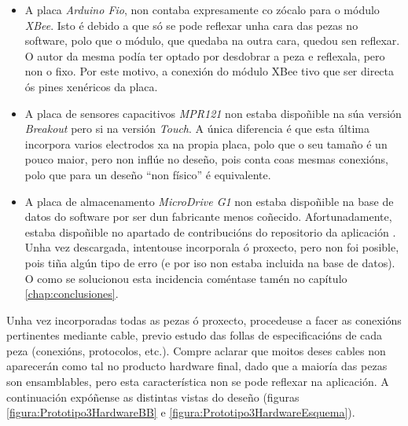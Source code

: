   \begin{itemize}
   \item A placa \textit{Arduino Fio}, non contaba expresamente co zócalo para
         o módulo \textit{XBee}. Isto é debido a que só se pode reflexar unha
         cara das pezas no software, polo que o módulo, que quedaba na outra
         cara, quedou sen reflexar. O autor da mesma podía ter optado por
         desdobrar a peza e reflexala, pero non o fixo. Por este motivo, a
         conexión do módulo XBee tivo que ser directa ós pines xenéricos da
         placa.
   \item A placa de sensores capacitivos \textit{MPR121} non estaba dispoñible
         na súa versión \textit{Breakout} pero si na versión \textit{Touch}. A
         única diferencia é que esta última incorpora varios electrodos xa na
         propia placa, polo que o seu tamaño é un pouco maior, pero non inflúe
         no deseño, pois conta coas mesmas conexións, polo que para un deseño
         ``non físico'' é equivalente.
   \item A placa de almacenamento \textit{MicroDrive G1} non estaba dispoñible
         na base de datos do software por ser dun fabricante menos coñecido.
         Afortunadamente, estaba dispoñible no apartado de contribucións do
         repositorio da aplicación \cite{FioContribucionsFritzing}. Unha vez
         descargada, intentouse incorporala ó proxecto, pero non foi posible,
         pois tiña algún tipo de erro (e por iso non estaba incluida na base de
         datos). O como se solucionou esta incidencia coméntase tamén no
         capítulo \ref{chap:conclusiones}.
  \end{itemize}

  Unha vez incorporadas todas as pezas ó proxecto, procedeuse a facer as
  conexións pertinentes mediante cable, previo estudo das follas de
  especificacións de cada peza (conexións, protocolos, etc.). Compre aclarar
  que moitos deses cables non aparecerán como tal no producto hardware final,
  dado que a maioría das pezas son ensamblables, pero esta característica non
  se pode reflexar na aplicación. A continuación expóñense as distintas vistas
  do deseño (figuras \ref{figura:Prototipo3HardwareBB} e
  \ref{figura:Prototipo3HardwareEsquema}).

